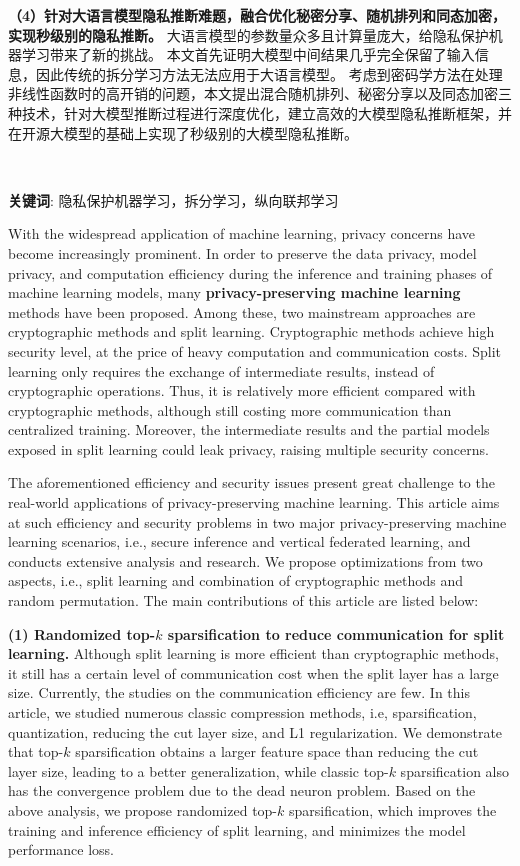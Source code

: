 \textbf{（4）针对大语言模型隐私推断难题，融合优化秘密分享、随机排列和同态加密，实现秒级别的隐私推断。}
大语言模型的参数量众多且计算量庞大，给隐私保护机器学习带来了新的挑战。
本文首先证明大模型中间结果几乎完全保留了输入信息，因此传统的拆分学习方法无法应用于大语言模型。
考虑到密码学方法在处理非线性函数时的高开销的问题，本文提出混合随机排列、秘密分享以及同态加密三种技术，针对大模型推断过程进行深度优化，建立高效的大模型隐私推断框架，并在开源大模型的基础上实现了秒级别的大模型隐私推断。

~

\noindent \textbf{关键词}: 隐私保护机器学习，拆分学习，纵向联邦学习


\cleardoublepage
{}
With the widespread application of machine learning, privacy concerns have become increasingly prominent.
In order to preserve the data privacy, model privacy, and computation efficiency during the inference and training phases of machine learning models, many \textbf{privacy-preserving machine learning} methods have been proposed.
%
Among these, two mainstream approaches are cryptographic methods and split learning.
%
Cryptographic methods achieve high security level, at the price of heavy computation and communication costs.
%
Split learning only requires the exchange of intermediate results, instead of cryptographic operations.
Thus, it is relatively more efficient compared with cryptographic methods, although still costing more communication than centralized training.
Moreover, the intermediate results and the partial models exposed in split learning could leak privacy, raising multiple security concerns.

The aforementioned efficiency and security issues present great challenge to the real-world applications of privacy-preserving machine learning.
%
This article aims at such efficiency and security problems in two major privacy-preserving machine learning scenarios, i.e., secure inference and vertical federated learning, and conducts extensive analysis and research.
%
We propose optimizations from two aspects, i.e., split learning and combination of cryptographic methods and random permutation.
%
The main contributions of this article are listed below:


\textbf{(1) Randomized top-$k$ sparsification to reduce communication for split learning.}
Although split learning is more efficient than cryptographic methods, it still has a certain level of communication cost when the split layer has a large size.
Currently, the studies on the communication efficiency are few.
%
In this article, we studied numerous classic compression methods, i.e, sparsification, quantization, reducing the cut layer size, and L1 regularization.
%
We demonstrate that top-$k$ sparsification obtains a larger feature space than reducing the cut layer size, leading to a better generalization, while classic top-$k$ sparsification also has the convergence problem due to the dead neuron problem.
%
Based on the above analysis, we propose randomized top-$k$ sparsification, which improves the training and inference efficiency of split learning, and minimizes the model performance loss.
%

